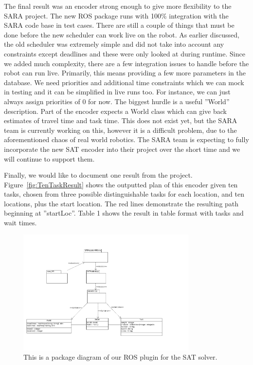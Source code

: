 \documentclass[11pt]{article}
\begin{document}
The final result was an encoder strong enough to
give more flexibility to the SARA project. The new
ROS package runs with 100\% integration with the SARA
code base in test cases. There are still a couple of
things that must be done before the new scheduler
can work live on the robot. As earlier discussed,
the old scheduler was extremely simple and did not take
into account any constraints except deadlines and these
were only looked at during runtime. Since we added much
complexity, there are a few integration issues to handle
before the robot can run live. Primarily, this means
providing a few more parameters in the database. We need
priorities and additional time constraints which we can
mock in testing and it can be simplified in live runs too.
For instance, we can just always assign priorities of 0
for now. The biggest hurdle is a useful ''World'' description.
Part of the encoder expects a World class which can give
back estimates of travel time and task time. This does
not exist yet, but the SARA team is currently working on
this, however it is a difficult problem, due to the
aforementioned chaos of real world robotics. The SARA
team is expecting to fully incorporate the new SAT encoder
into their project over the short time and we will
continue to support them.

Finally, we would like to document one result from the
project. Figure~\ref{fig:TenTaskResult} shows the outputted
plan of this encoder given ten tasks, chosen from three
possible distinguishable tasks for each location, and
ten locations, plus the start location. The red lines
demonstrate the resulting path beginning at ''startLoc''.
Table 1 shows the result in table format with tasks and wait
times.


\begin{figure}
\centering
\includegraphics[width=0.8\textwidth]{ROS_Package_Diagram.png}
\caption{\label{fig:ROSPackageDiag}This is a package diagram of our ROS plugin for the SAT solver.}
\end{figure}
\end{document}
